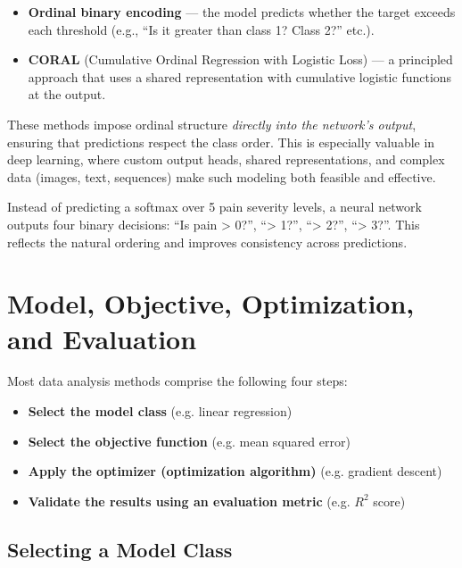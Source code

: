 \documentclass[12pt,openany, draft]{book}
\begin{document}
\begin{itemize}
    \item \textbf{Ordinal binary encoding} — the model predicts whether the target exceeds each threshold (e.g., ``Is it greater than class 1? Class 2?'' etc.).
    \item \textbf{CORAL} (Cumulative Ordinal Regression with Logistic Loss) — a principled approach that uses a shared representation with cumulative logistic functions at the output.
\end{itemize}

These methods impose ordinal structure \emph{directly into the network’s output}, ensuring that predictions respect the class order. This is especially valuable in deep learning, where custom output heads, shared representations, and complex data (images, text, sequences) make such modeling both feasible and effective.

\begin{examplebox}
Instead of predicting a softmax over 5 pain severity levels, a neural network outputs four binary decisions: “Is pain \textgreater{} 0?”, “\textgreater{} 1?”, “\textgreater{} 2?”, “\textgreater{} 3?”. This reflects the natural ordering and improves consistency across predictions.
\end{examplebox}

\vspace{10pt}




\chapter{Model, Objective, Optimization, and Evaluation}

Most data analysis methods comprise the following four steps:
\begin{itemize}
    \item \textbf{Select the model class} (e.g. linear regression)
    \item \textbf{Select the objective function} (e.g. mean squared error)
    \item \textbf{Apply the optimizer (optimization algorithm)} (e.g. gradient descent)
    \item \textbf{Validate the results using an evaluation metric} (e.g. $R^2$ score)
\end{itemize}



\section{Selecting a Model Class}
\end{document}
